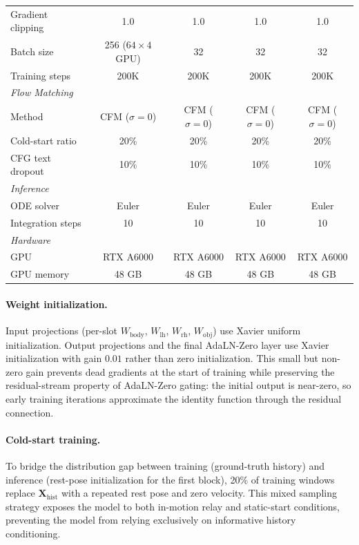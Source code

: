 \documentclass[sigconf, screen, review, anonymous]{acmart}
\begin{document}
\begin{table}[t]
\begin{tabular}{@{}lcccc@{}}
    \quad Gradient clipping & 1.0 & 1.0 & 1.0 & 1.0 \\
    \quad Batch size & 256 ($64 \times 4$ GPU) & 32 & 32 & 32 \\
    \quad Training steps & 200K & 200K & 200K & 200K \\
    \midrule
    \multicolumn{5}{l}{\textit{Flow Matching}} \\
    \quad Method & CFM ($\sigma{=}0$) & CFM ($\sigma{=}0$) & CFM ($\sigma{=}0$) & CFM ($\sigma{=}0$) \\
    \quad Cold-start ratio & 20\% & 20\% & 20\% & 20\% \\
    \quad CFG text dropout & 10\% & 10\% & 10\% & 10\% \\
    \midrule
    \multicolumn{5}{l}{\textit{Inference}} \\
    \quad ODE solver & Euler & Euler & Euler & Euler \\
    \quad Integration steps & 10 & 10 & 10 & 10 \\
    \midrule
    \multicolumn{5}{l}{\textit{Hardware}} \\
    \quad GPU & RTX A6000 & RTX A6000 & RTX A6000 & RTX A6000 \\
    \quad GPU memory & 48 GB & 48 GB & 48 GB & 48 GB \\
    \bottomrule
  \end{tabular}
\end{table}

\paragraph{Weight initialization.}
Input projections (per-slot $W_{\text{body}}$, $W_{\text{lh}}$, $W_{\text{rh}}$, $W_{\text{obj}}$) use Xavier uniform initialization. Output projections and the final AdaLN-Zero layer use Xavier initialization with gain $0.01$ rather than zero initialization. This small but non-zero gain prevents dead gradients at the start of training while preserving the residual-stream property of AdaLN-Zero gating: the initial output is near-zero, so early training iterations approximate the identity function through the residual connection.

\paragraph{Cold-start training.}
To bridge the distribution gap between training (ground-truth history) and inference (rest-pose initialization for the first block), 20\% of training windows replace $\mathbf{X}_{\text{hist}}$ with a repeated rest pose and zero velocity. This mixed sampling strategy exposes the model to both in-motion relay and static-start conditions, preventing the model from relying exclusively on informative history conditioning.
\end{document}
